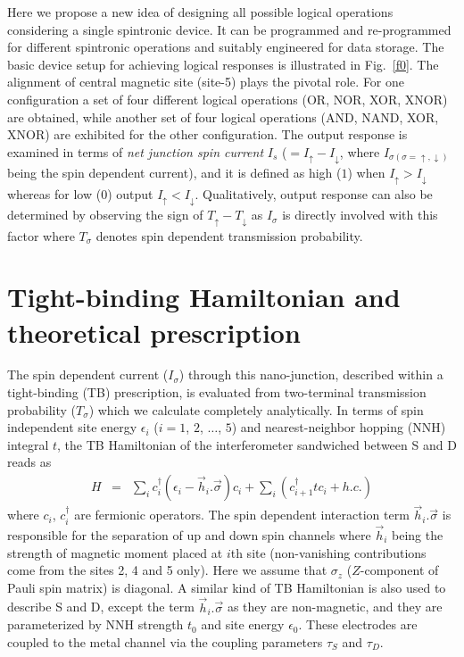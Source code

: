 \documentclass[doublecol]{epl2}
\begin{document}
Here we propose a new idea of designing all possible logical operations 
considering a single spintronic device. It can be programmed and re-programmed
for different spintronic operations and suitably engineered for data storage.
The basic device setup for achieving logical responses is illustrated in 
Fig.~\ref{f0}. The alignment of central magnetic site (site-5) plays the 
pivotal role. For one configuration a set of four different logical operations
(OR, NOR, XOR, XNOR) are obtained, while another set of four logical operations 
(AND, NAND, XOR, XNOR) are exhibited for the other configuration. The output
response is examined in terms of {\em net junction spin current} $I_s$ 
($=I_{\uparrow}-I_{\downarrow}$, where 
$I_{\sigma (\sigma=\uparrow,\downarrow)}$ being the spin dependent current),
and it is defined as high ($1$) when $I_{\uparrow}>I_{\downarrow}$ whereas
for low ($0$) output $I_{\uparrow}<I_{\downarrow}$. Qualitatively, output
response can also be determined by observing the sign of 
$T_{\uparrow}-T_{\downarrow}$ as $I_{\sigma}$ is directly involved with this 
factor where $T_{\sigma}$ denotes spin dependent transmission probability.

\section{Tight-binding Hamiltonian and theoretical prescription}

The spin dependent current ($I_{\sigma}$) through this nano-junction, 
described within a tight-binding (TB) prescription, is evaluated from 
two-terminal transmission probability ($T_{\sigma}$) which we calculate 
completely analytically. In terms of spin independent site energy $\epsilon_i$ 
($i=1$, $2$, $\dots$, $5$) and nearest-neighbor hopping (NNH) integral $t$, 
the TB Hamiltonian of the interferometer sandwiched between S and D reads as 
\begin{eqnarray}
H & = & \sum\limits_{i}c_i^{\dagger} \left(\epsilon_i-\vec{h}_i.\vec{\sigma}
\right)c_i + \sum\limits_{i} \left(c_{i+1}^{\dagger} t c_i +
h.c. \right)
\label{eq1}
\end{eqnarray}
where $c_i$, $c_i^{\dagger}$ are fermionic operators. The spin dependent
interaction term $\vec{h}_i.\vec{\sigma}$ is responsible for the separation
of up and down spin channels where $\vec{h}_i$ being the strength of magnetic
moment placed at $i$th site (non-vanishing contributions come from the sites
2, 4 and 5 only). Here we assume that $\sigma_z$ ($Z$-component of Pauli
spin matrix) is diagonal. A similar kind of TB Hamiltonian is also used 
to describe S and D, except the term $\vec{h}_i.\vec{\sigma}$ as they are 
non-magnetic, and they are parameterized by NNH strength $t_0$ and site
energy $\epsilon_0$. These electrodes are coupled to the metal channel via 
the coupling parameters $\tau_S$ and $\tau_D$. 
\end{document}
